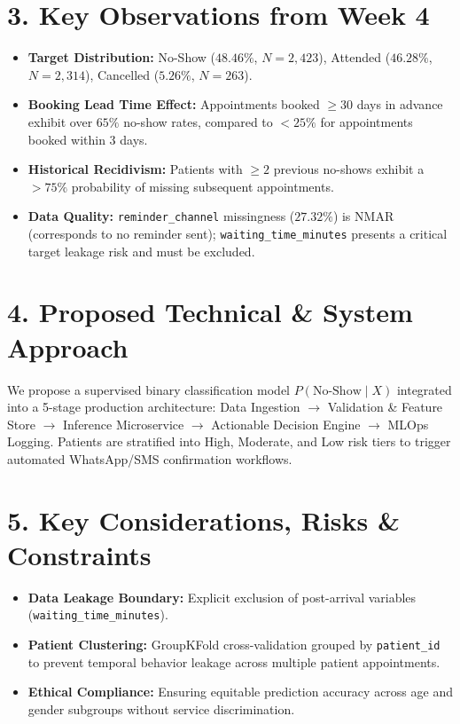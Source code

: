 \documentclass[11pt,a4paper]{article}
\begin{document}
\section*{3. Key Observations from Week 4}
\begin{itemize}
    \item \textbf{Target Distribution:} No-Show ($48.46\%$, $N=2,423$), Attended ($46.28\%$, $N=2,314$), Cancelled ($5.26\%$, $N=263$).
    \item \textbf{Booking Lead Time Effect:} Appointments booked $\ge 30$ days in advance exhibit over $65\%$ no-show rates, compared to $<25\%$ for appointments booked within 3 days.
    \item \textbf{Historical Recidivism:} Patients with $\ge 2$ previous no-shows exhibit a $>75\%$ probability of missing subsequent appointments.
    \item \textbf{Data Quality:} \texttt{reminder\_channel} missingness ($27.32\%$) is NMAR (corresponds to no reminder sent); \texttt{waiting\_time\_minutes} presents a critical target leakage risk and must be excluded.
\end{itemize}

\section*{4. Proposed Technical \& System Approach}
We propose a supervised binary classification model $P(\text{No-Show} \mid X)$ integrated into a 5-stage production architecture: Data Ingestion $\rightarrow$ Validation \& Feature Store $\rightarrow$ Inference Microservice $\rightarrow$ Actionable Decision Engine $\rightarrow$ MLOps Logging. Patients are stratified into High, Moderate, and Low risk tiers to trigger automated WhatsApp/SMS confirmation workflows.

\section*{5. Key Considerations, Risks \& Constraints}
\begin{itemize}
    \item \textbf{Data Leakage Boundary:} Explicit exclusion of post-arrival variables (\texttt{waiting\_time\_minutes}).
    \item \textbf{Patient Clustering:} GroupKFold cross-validation grouped by \texttt{patient\_id} to prevent temporal behavior leakage across multiple patient appointments.
    \item \textbf{Ethical Compliance:} Ensuring equitable prediction accuracy across age and gender subgroups without service discrimination.
\end{itemize}
\end{document}
